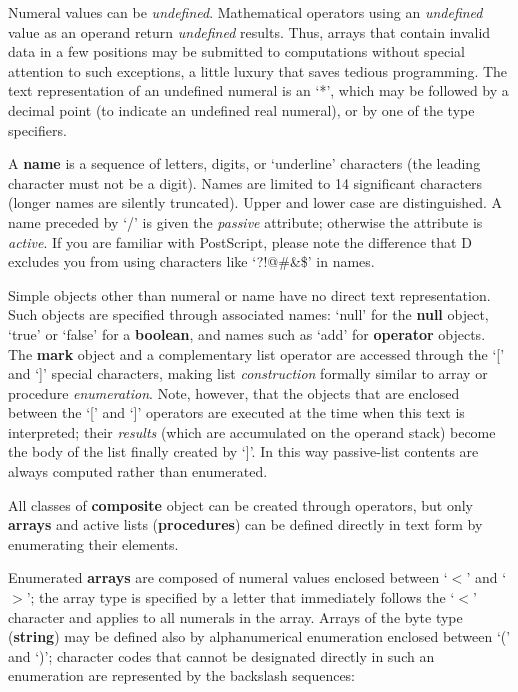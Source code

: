 Numeral  values  can  be  \emph{undefined}.  Mathematical  operators  using  an \emph{undefined} value as an operand return \emph{undefined} results. Thus, arrays that contain invalid data in a few positions may be submitted to  computations without special attention to such exceptions,  a little luxury that saves tedious programming.  The text representation of an undefined numeral  is an  `*',  which  may  be  followed by a decimal  point  (to  indicate  an undefined real numeral), or by one of the type specifiers.

A \textbf{name} is a sequence of letters,  digits, or `underline' characters (the leading character must not be a digit). Names are limited to 14 significant characters (longer names are silently truncated).  Upper and lower case are distinguished. A name preceded by `/' is given the \emph{passive} attribute; otherwise the attribute is \emph{active}.  If you are familiar with  PostScript, please note the difference that D excludes you from using characters like `?!@#&\$' in names.

Simple  objects  other  than  numeral  or  name  have  no  direct   text representation.  Such  objects  are specified through  associated  names: `null' for the \textbf{null} object,  `true' or `false' for a \textbf{boolean},  and  names such as `add' for \textbf{operator} objects.  The \textbf{mark} object and a  complementary list  operator  are accessed through the `[' and `]'  special  characters, making  list  \emph{construction} formally  similar  to  array  or   procedure \emph{enumeration}. Note, however, that the objects that are enclosed between the `[' and `]' operators are executed at the time when this text is interpreted; their \emph{results} (which are accumulated on the operand stack) become the body of the list finally created by `]'. In this way passive-list contents are always computed rather than enumerated.

All  classes of \textbf{composite} object can be created through  operators,  but only  \textbf{arrays}  and active lists (\textbf{procedures}) can be  defined  directly  in text form by enumerating their elements.

Enumerated \textbf{arrays} are  composed of numeral values enclosed between  `$<$'  and  `$>$';  the array type is specified by  a  letter that immediately follows  the  `$<$'  character and applies to all numerals in the array.  Arrays  of  the byte type (\textbf{string}) may be defined  also  by alphanumerical  enumeration enclosed between `(' and `)';  character codes  that cannot  be designated directly in such an enumeration are represented  by the backslash sequences:\\

